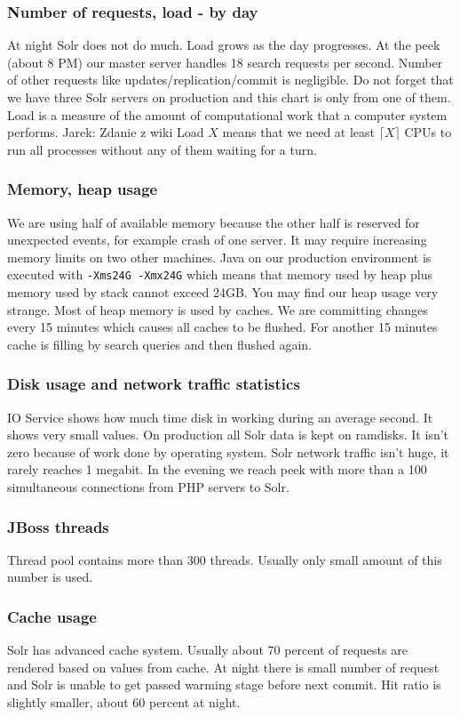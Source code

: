 \documentclass[10pt,a4paper]{article}
\newcommand{\jarek}[1]{\noindent\colorbox{myYellow}{Jarek: #1}}
\begin{document}
\subsubsection*{Number of requests, load - by day} 
At night Solr does not do much. Load grows as the day progresses. At the peek (about 8 PM) our master server handles 18 search requests per second. Number of other requests like updates/replication/commit is negligible. Do not forget that we have three Solr servers on production and this chart is only from one of them. Load is a measure of the amount of computational work that a computer system performs. \jarek{Zdanie z wiki} Load $X$ means that we need at least $\lceil X \rceil$ CPUs to run all processes without any of them waiting for a turn. 

\subsubsection*{Memory, heap usage}
We are using half of available memory because the other half is reserved for unexpected events, for example crash of one server. It may require increasing memory limits on two other machines. Java on our production environment is executed with \verb|-Xms24G -Xmx24G| which means that memory used by heap plus memory used by stack cannot exceed 24GB. You may find our heap usage very strange. Most of heap memory is used by caches. We are committing changes every 15 minutes which causes all caches to be flushed. For another 15 minutes cache is filling by search queries and then flushed again.

\subsubsection*{Disk usage and network traffic statistics}
IO Service shows how much time disk in working during an average second. It shows very small values. On production all Solr data is kept on ramdisks. It isn't zero because of work done by operating system. Solr network traffic isn't huge, it rarely reaches 1 megabit. In the evening we reach peek with more than a 100 simultaneous connections from PHP servers to Solr.


\subsubsection*{JBoss threads}
Thread pool contains more than 300 threads. Usually only small amount of this number is used.

\subsubsection*{Cache usage}
Solr has advanced cache system. Usually about 70 percent of requests are rendered based on values from cache.  At night there is small number of request and Solr is unable to get passed warming stage before next commit.  Hit ratio is slightly smaller, about 60 percent at night.
\end{document}
